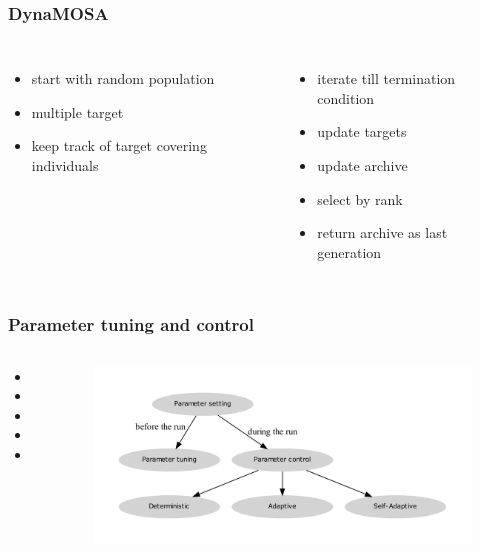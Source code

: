 \begin{frame}
	\frametitle{DynaMOSA}
	
	\begin{columns}[c]
		
		
		\begin{itemize}
			\item start with random population
			\item multiple target
			\item keep track of target covering individuals
		\end{itemize}
		
		
		\begin{itemize}
			\item iterate till termination condition
			\item update targets
			\item update archive
			\item select by rank
			\item return archive as last generation
		\end{itemize}	
		
	\end{columns}
	
\end{frame}

\begin{frame}
	\frametitle{Parameter tuning and control}
	
	\begin{columns}[c]
		
		\column{.45\textwidth}

		\begin{itemize}
			\item 
			\item 
			\item 
			\item
			\item
		\end{itemize}
		
		\column{.45\textwidth}
		\begin{figure}
			\includegraphics[width=1\textwidth]{figures/flowchart_parameter_control}
		\end{figure}

	\end{columns}
	
\end{frame}